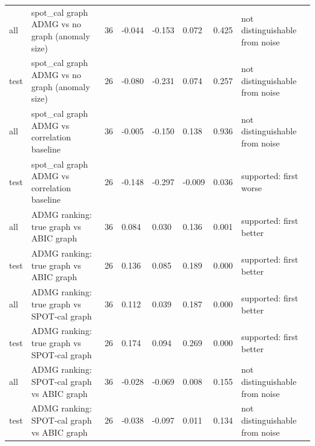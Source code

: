 \begin{table}[t]
\begin{tabular}{@{}llllllll@{}}
all & spot\_cal graph ADMG vs no graph (anomaly size) & 36 & -0.044 & -0.153 & 0.072 & 0.425 & not distinguishable from noise\\
test & spot\_cal graph ADMG vs no graph (anomaly size) & 26 & -0.080 & -0.231 & 0.074 & 0.257 & not distinguishable from noise\\
all & spot\_cal graph ADMG vs correlation baseline & 36 & -0.005 & -0.150 & 0.138 & 0.936 & not distinguishable from noise\\
test & spot\_cal graph ADMG vs correlation baseline & 26 & -0.148 & -0.297 & -0.009 & 0.036 & supported: first worse\\
all & ADMG ranking: true graph vs ABIC graph & 36 & 0.084 & 0.030 & 0.136 & 0.001 & supported: first better\\
test & ADMG ranking: true graph vs ABIC graph & 26 & 0.136 & 0.085 & 0.189 & 0.000 & supported: first better\\
all & ADMG ranking: true graph vs SPOT-cal graph & 36 & 0.112 & 0.039 & 0.187 & 0.000 & supported: first better\\
test & ADMG ranking: true graph vs SPOT-cal graph & 26 & 0.174 & 0.094 & 0.269 & 0.000 & supported: first better\\
all & ADMG ranking: SPOT-cal graph vs ABIC graph & 36 & -0.028 & -0.069 & 0.008 & 0.155 & not distinguishable from noise\\
test & ADMG ranking: SPOT-cal graph vs ABIC graph & 26 & -0.038 & -0.097 & 0.011 & 0.134 & not distinguishable from noise\\
\bottomrule
\end{tabular}
\end{table}
